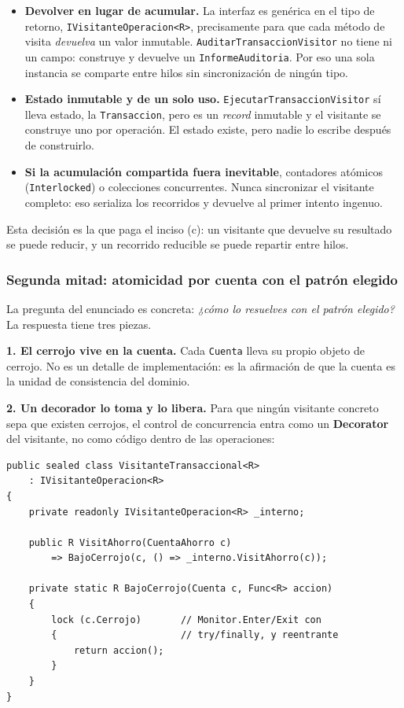 \begin{itemize}[leftmargin=1.2cm]
    \item \textbf{Devolver en lugar de acumular.} La interfaz es genérica en el tipo de
          retorno, \texttt{IVisitanteOperacion<R>}, precisamente para que cada método de
          visita \emph{devuelva} un valor inmutable.
          \texttt{AuditarTransaccionVisitor} no tiene ni un campo: construye y devuelve un
          \texttt{InformeAuditoria}. Por eso una sola instancia se comparte entre hilos sin
          sincronización de ningún tipo.
    \item \textbf{Estado inmutable y de un solo uso.}
          \texttt{EjecutarTransaccionVisitor} sí lleva estado, la \texttt{Transaccion}, pero
          es un \textit{record} inmutable y el visitante se construye uno por operación. El
          estado existe, pero nadie lo escribe después de construirlo.
    \item \textbf{Si la acumulación compartida fuera inevitable}, contadores atómicos
          (\texttt{Interlocked}) o colecciones concurrentes. Nunca sincronizar el visitante
          completo: eso serializa los recorridos y devuelve al primer intento ingenuo.
\end{itemize}

Esta decisión es la que paga el inciso (c): un visitante que devuelve su resultado se puede
reducir, y un recorrido reducible se puede repartir entre hilos.

\subsubsection*{Segunda mitad: atomicidad por cuenta con el patrón elegido}

La pregunta del enunciado es concreta: \emph{¿cómo lo resuelves con el patrón elegido?} La
respuesta tiene tres piezas.

\textbf{1. El cerrojo vive en la cuenta.} Cada \texttt{Cuenta} lleva su propio objeto de
cerrojo. No es un detalle de implementación: es la afirmación de que la cuenta es la unidad de
consistencia del dominio.

\textbf{2. Un decorador lo toma y lo libera.} Para que ningún visitante concreto sepa que
existen cerrojos, el control de concurrencia entra como un \textbf{Decorator} del visitante,
no como código dentro de las operaciones:

{\small
\begin{verbatim}
public sealed class VisitanteTransaccional<R>
    : IVisitanteOperacion<R>
{
    private readonly IVisitanteOperacion<R> _interno;

    public R VisitAhorro(CuentaAhorro c)
        => BajoCerrojo(c, () => _interno.VisitAhorro(c));

    private static R BajoCerrojo(Cuenta c, Func<R> accion)
    {
        lock (c.Cerrojo)       // Monitor.Enter/Exit con
        {                      // try/finally, y reentrante
            return accion();
        }
    }
}
\end{verbatim}
}

